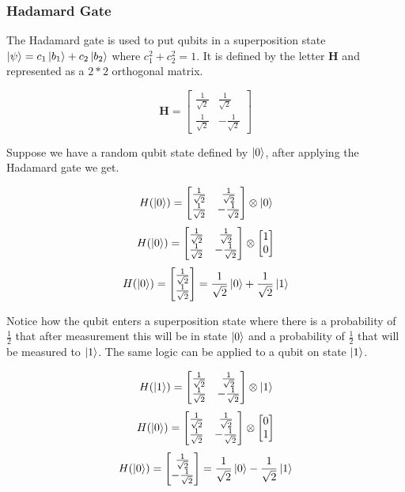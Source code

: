 \documentclass[12pt,a4paper]{scrartcl}
\newcommand{\tens}[1]{%
  \mathbin{\mathop{\otimes}\displaylimits_{#1}}%
}
\begin{document}
\subsubsection{Hadamard Gate}

The Hadamard gate is used to put qubits in a superposition state $\ket{\psi} = c_1\ket{b_1} + c_2\ket{b_2}$ where $c_1^2 + c_2^2 = 1$. It is defined by the letter \textbf{H} and represented as a $2*2$ orthogonal matrix.


\begin{equation}
 \boldsymbol{H} = \begin{bmatrix}\frac{1}{\sqrt{2}} &  \frac{1}{\sqrt{2}} \\ \frac{1}{\sqrt{2}} & -\frac{1}{\sqrt{2}} \end{bmatrix}
\label{gate:hadamard}   
\end{equation}

Suppose we have a random qubit state defined by $\ket{0}$, after applying the Hadamard gate we get.

\[H(\ket{0})  = \begin{bmatrix}\frac{1}{\sqrt{2}} &  \frac{1}{\sqrt{2}} \\ \frac{1}{\sqrt{2}} & -\frac{1}{\sqrt{2}} \end{bmatrix} \tens{} \ket{0}\]
\[H(\ket{0})  = \begin{bmatrix}\frac{1}{\sqrt{2}} &  \frac{1}{\sqrt{2}} \\ \frac{1}{\sqrt{2}} & -\frac{1}{\sqrt{2}} \end{bmatrix} \tens{} \begin{bmatrix} 1 \\ 0 \end{bmatrix}\]
\[H(\ket{0})  = \begin{bmatrix}\frac{1}{\sqrt{2}}  \\ \frac{1}{\sqrt{2}} \end{bmatrix} = \frac{1}{\sqrt{2}}\ket{0} + \frac{1}{\sqrt{2}}\ket{1}\]

Notice how the qubit enters a superposition state where there is a probability of $\frac{1}{2}$ that after measurement this will be in state $\ket{0}$ and a probability of $\frac{1}{2}$ that will be measured to $\ket{1}$. The same logic can be applied to a qubit on state $\ket{1}$.

\[H(\ket{1})  = \begin{bmatrix}\frac{1}{\sqrt{2}} &  \frac{1}{\sqrt{2}} \\ \frac{1}{\sqrt{2}} & -\frac{1}{\sqrt{2}} \end{bmatrix} \tens{} \ket{1}\]
\[H(\ket{0})  = \begin{bmatrix}\frac{1}{\sqrt{2}} &  \frac{1}{\sqrt{2}} \\ \frac{1}{\sqrt{2}} & -\frac{1}{\sqrt{2}} \end{bmatrix} \tens{} \begin{bmatrix} 0 \\ 1 \end{bmatrix}\]
\[H(\ket{0})  = \begin{bmatrix}\frac{1}{\sqrt{2}}  \\ -\frac{1}{\sqrt{2}} \end{bmatrix} = \frac{1}{\sqrt{2}}\ket{0} - \frac{1}{\sqrt{2}}\ket{1}\]
\end{document}
